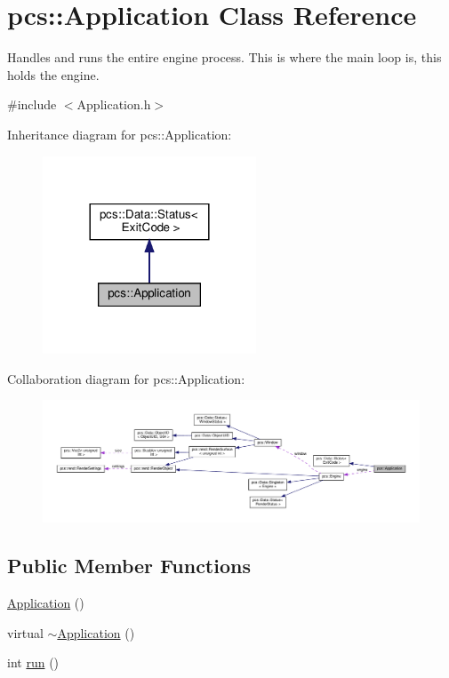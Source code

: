 \hypertarget{classpcs_1_1Application}{}\section{pcs\+:\+:Application Class Reference}
\label{classpcs_1_1Application}


Handles and runs the entire engine process. This is where the main loop is, this holds the engine.  




{\ttfamily \#include $<$Application.\+h$>$}



Inheritance diagram for pcs\+:\+:Application\+:\nopagebreak
\begin{figure}[H]
\begin{center}
\leavevmode
\includegraphics[width=180pt]{classpcs_1_1Application__inherit__graph}
\end{center}
\end{figure}


Collaboration diagram for pcs\+:\+:Application\+:
\nopagebreak
\begin{figure}[H]
\begin{center}
\leavevmode
\includegraphics[width=350pt]{classpcs_1_1Application__coll__graph}
\end{center}
\end{figure}
\subsection*{Public Member Functions}
\begin{DoxyCompactItemize}
\item 
\hyperlink{classpcs_1_1Application_ad6c3666170e75e512603b3393c63ebd6}{Application} ()
\item 
virtual \hyperlink{classpcs_1_1Application_a3f81ec18fc0b79fd0ad9114fe020828d}{$\sim$\+Application} ()
\item 
int \hyperlink{classpcs_1_1Application_a00bc11d70a0aa5a8f7f5d03f357af712}{run} ()
\end{DoxyCompactItemize}
